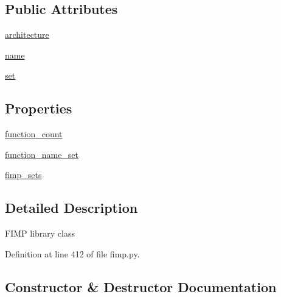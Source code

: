 \subsection*{Public Attributes}
\begin{DoxyCompactItemize}
\item 
\hyperlink{classsylva_1_1base_1_1fimp_1_1fimp__lib_a8286e3fa2d4188bfa83f4130959a8907}{architecture}
\item 
\hyperlink{classsylva_1_1base_1_1fimp_1_1fimp__lib_aeb997b1d0dcc07395898b441609aa898}{name}
\item 
\hyperlink{classsylva_1_1base_1_1fimp_1_1fimp__lib_a6d2f4a5c592b6fc32418dc27129326ac}{set}
\end{DoxyCompactItemize}
\subsection*{Properties}
\begin{DoxyCompactItemize}
\item 
\hyperlink{classsylva_1_1base_1_1fimp_1_1fimp__lib_af017d651d8249d243476a42a52d71b61}{function\+\_\+count}
\item 
\hyperlink{classsylva_1_1base_1_1fimp_1_1fimp__lib_a49bd10a263150c845e87e4134d893e84}{function\+\_\+name\+\_\+set}
\item 
\hyperlink{classsylva_1_1base_1_1fimp_1_1fimp__lib_a35e572d841ddc8a2f4ea44fdf823e92d}{fimp\+\_\+sets}
\end{DoxyCompactItemize}


\subsection{Detailed Description}
\begin{DoxyVerb}  FIMP library class
\end{DoxyVerb}
 

Definition at line 412 of file fimp.\+py.



\subsection{Constructor \& Destructor Documentation}
\mbox{\label{classsylva_1_1base_1_1fimp_1_1fimp__lib_ab6ffd2deebd88d1adbef821af05a26e5}} 
